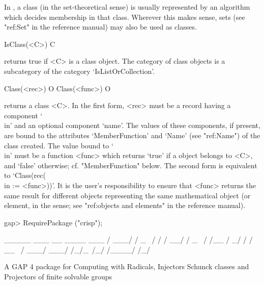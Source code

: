 
In {\CRISP}, a class (in the set-theoretical sense) is usually represented
by an algorithm which decides membership in that class. Wherever this makes
sense, sets (see "ref:Set" in the {\GAP} reference
manual) may also be used as classes.


\null


\>IsClass(<C>) C

returns true if <C> is a class object. The category of class objects is a
subcategory of the category `IsListOrCollection'.

\>Class(<rec>) O
\>Class(<func>) O

returns a class <C>. In the first form, <rec> must be a record having a
component `\\in' and an optional component `name'. The values of these
components, if present, are bound to the attributes `MemberFunction' and
`Name' (see "ref:Name") of the class created. The value bound to `\\in' must be a function
<func> which returns `true' if a {\GAP} object belongs to <C>, and `false'
otherwise; cf. "MemberFunction" below. The second form is equivalent to `Class(rec(\\in
:= <func>))'. It is the user's responsibility to ensure that <func> returns the same
result for different {\GAP} objects representing the same mathematical object (or
element, in the {\GAP} sense; see "ref:objects and elements" in the {\GAP}
reference manual).

\beginexample
gap> RequirePackage ("crisp");
                                                   
             _____  ___    __  ____   ___        
            / ___/ / _ \  / / / __/  / _ \       
           / /__  /   _/ / / _\_ \  / ___/       
           \___/ /_/\_\ /_/ /____/ /_/           
                                                    
                 A GAP 4 package for           
          Computing with Radicals, Injectors        
            Schunck classes and Projectors          
              of finite solvable groups             
                                                    
